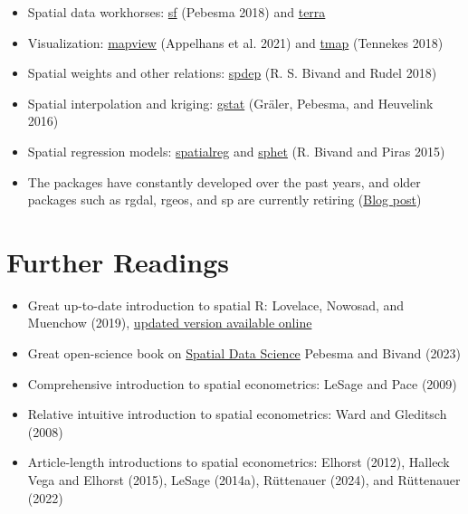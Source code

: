 \documentclass[
  letterpaper,
]{scrbook}
\begin{document}
\begin{itemize}
\item
  Spatial data workhorses:
  \href{https://cran.r-project.org/web/packages/sf/index.html}{sf}
  (Pebesma 2018) and
  \href{https://cran.r-project.org/web/packages/terra/index.html}{terra}
\item
  Visualization:
  \href{https://cran.r-project.org/web/packages/mapview/index.html}{mapview}
  (Appelhans et al. 2021) and
  \href{https://cran.r-project.org/web/packages/tmap/index.html}{tmap}
  (Tennekes 2018)
\item
  Spatial weights and other relations:
  \href{https://cran.r-project.org/web/packages/stars/index.html}{spdep}
  (R. S. Bivand and Rudel 2018)
\item
  Spatial interpolation and kriging:
  \href{https://cran.r-project.org/web/packages/gstat/index.html}{gstat}
  (Gräler, Pebesma, and Heuvelink 2016)
\item
  Spatial regression models:
  \href{https://cran.r-project.org/web/packages/spatialreg/index.html}{spatialreg}
  and
  \href{https://cran.r-project.org/web/packages/sphet/index.html}{sphet}
  (R. Bivand and Piras 2015)
\item
  The packages have constantly developed over the past years, and older
  packages such as rgdal, rgeos, and sp are currently retiring
  (\href{https://geocompx.org/post/2023/rgdal-retirement/}{Blog post})
\end{itemize}

\hypertarget{further-readings}{%
\section*{Further Readings}\label{further-readings}}


\begin{itemize}
\item
  Great up-to-date introduction to spatial R: Lovelace, Nowosad, and
  Muenchow (2019), \href{https://geocompr.robinlovelace.net/}{updated
  version available online}
\item
  Great open-science book on
  \href{https://www.r-spatial.org/book}{Spatial Data Science} Pebesma
  and Bivand (2023)
\item
  Comprehensive introduction to spatial econometrics: LeSage and Pace
  (2009)
\item
  Relative intuitive introduction to spatial econometrics: Ward and
  Gleditsch (2008)
\item
  Article-length introductions to spatial econometrics: Elhorst (2012),
  Halleck Vega and Elhorst (2015), LeSage (2014a), Rüttenauer (2024),
  and Rüttenauer (2022)
\end{itemize}
\end{document}
